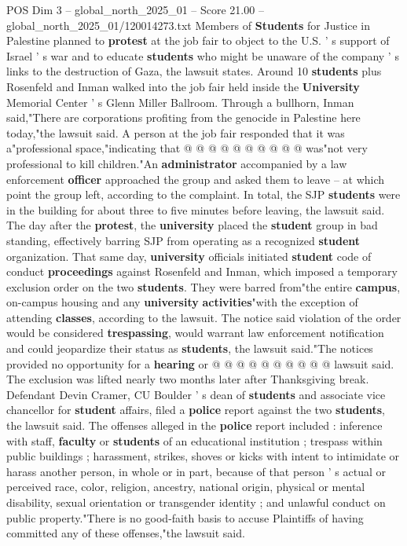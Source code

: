 \begin{textsample}{POS Dim 3 – global\_north\_2025\_01 – Score 21.00 – global\_north\_2025\_01/120014273.txt}
Members of \textbf{Students} for Justice in Palestine planned to \textbf{protest} at the job fair to object to the U.S. ' s support of Israel ' s war and to educate \textbf{students} who might be unaware of the company ' s links to the destruction of Gaza, the lawsuit states.
Around 10 \textbf{students} plus Rosenfeld and Inman walked into the job fair held inside the \textbf{University} Memorial Center ' s Glenn Miller Ballroom.
Through a bullhorn, Inman said,"There are corporations profiting from the genocide in Palestine here today,"the lawsuit said.
A person at the job fair responded that it was a"professional space,"indicating that @ @ @ @ @ @ @ @ @ @ was"not very professional to kill children."An \textbf{administrator} accompanied by a law enforcement \textbf{officer} approached the group and asked them to leave -- at which point the group left, according to the complaint.
In total, the SJP \textbf{students} were in the building for about three to five minutes before leaving, the lawsuit said.
The day after the \textbf{protest}, the \textbf{university} placed the \textbf{student} group in bad standing, effectively barring SJP from operating as a recognized \textbf{student} organization.
That same day, \textbf{university} officials initiated \textbf{student} code of conduct \textbf{proceedings} against Rosenfeld and Inman, which imposed a temporary exclusion order on the two \textbf{students}.
They were barred from"the entire \textbf{campus}, on-campus housing and any \textbf{university} \textbf{activities}"with the exception of attending \textbf{classes}, according to the lawsuit.
The notice said violation of the order would be considered \textbf{trespassing}, would warrant law enforcement notification and could jeopardize their status as \textbf{students}, the lawsuit said."The notices provided no opportunity for a \textbf{hearing} or @ @ @ @ @ @ @ @ @ @ lawsuit said.
The exclusion was lifted nearly two months later after Thanksgiving break.
Defendant Devin Cramer, CU Boulder ' s dean of \textbf{students} and associate vice chancellor for \textbf{student} affairs, filed a \textbf{police} report against the two \textbf{students}, the lawsuit said.
The offenses alleged in the \textbf{police} report included : inference with staff, \textbf{faculty} or \textbf{students} of an educational institution ; trespass within public buildings ; harassment, strikes, shoves or kicks with intent to intimidate or harass another person, in whole or in part, because of that person ' s actual or perceived race, color, religion, ancestry, national origin, physical or mental disability, sexual orientation or transgender identity ; and unlawful conduct on public property."There is no good-faith basis to accuse Plaintiffs of having committed any of these offenses,"the lawsuit said.

\end{textsample}
